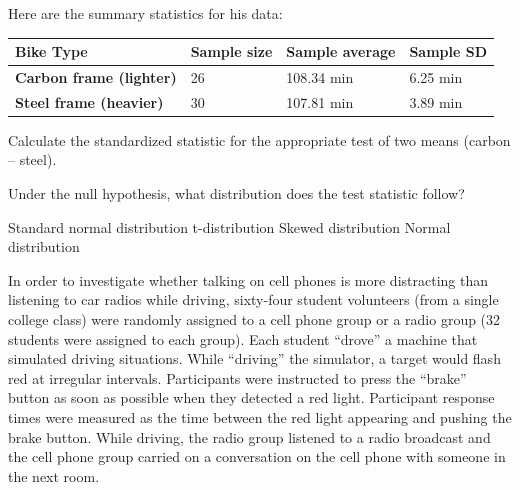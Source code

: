 \documentclass{article}
\begin{document}
\begin{mcquestions}
\begin{mcquestioninstruction}
			Here are the summary statistics for his data:
			
			\begin{center}
				\begin{tabular}{| l | l | l | l |}
					\hline
					\textbf{Bike Type} & \textbf{Sample size} & \textbf{Sample average} & \textbf{Sample SD} \\
					\hline
					\textbf{Carbon frame (lighter)} & 26 & 108.34 min & 6.25 min \\
					\hline
					\textbf{Steel frame (heavier)} & 30 & 107.81 min & 3.89 min \\
					\hline
				\end{tabular}
			\end{center}
		\end{mcquestioninstruction}
		
		\question Calculate the standardized statistic for the appropriate test of two means (carbon – steel).
		\begin{mcanswerslist}
		\end{mcanswerslist}
		
		\question[follow] Under the null hypothesis, what distribution does the test statistic follow?
		\begin{mcanswerslist}
			\answer Standard normal distribution
			\answer[correct] t-distribution
			\answer Skewed distribution
			\answer Normal distribution
		\end{mcanswerslist}
		
		\begin{mcquestioninstruction}
			In order to investigate whether talking on cell phones is more distracting than listening to car radios while driving, sixty-four student volunteers (from a single college class) were randomly assigned to a cell phone group or a radio group (32 students were assigned to each group). Each student ``drove'' a machine that simulated driving situations. While ``driving'' the simulator, a target would flash red at irregular intervals. Participants were instructed to press the ``brake'' button as soon as possible when they detected a red light. Participant response times were measured as the time between the red light appearing and pushing the brake button. While driving, the radio group listened to a radio broadcast and the cell phone group carried on a conversation on the cell phone with someone in the next room.
		\end{mcquestioninstruction}
		

\end{mcquestions}
\end{document}
